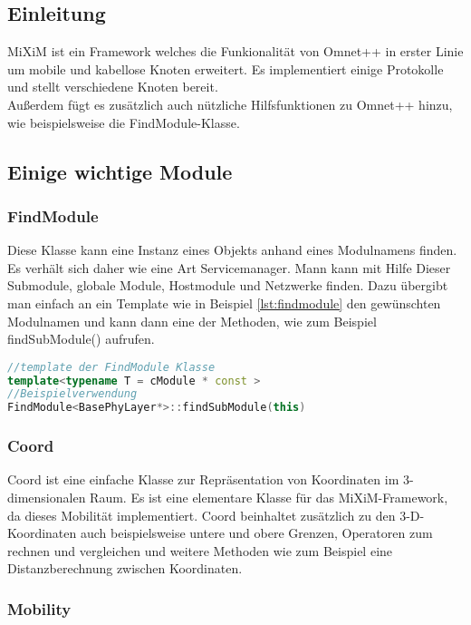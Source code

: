 \subsection{Einleitung}

MiXiM\cite{mixim} ist ein Framework welches die Funkionalität von Omnet++ in erster Linie um mobile und kabellose Knoten erweitert. Es implementiert einige Protokolle und stellt verschiedene Knoten bereit.\\
Außerdem fügt es zusätzlich auch nützliche Hilfsfunktionen zu Omnet++ hinzu, wie beispielsweise die FindModule-Klasse.

\subsection{Einige wichtige Module}

\subsubsection{FindModule}

Diese Klasse kann eine Instanz eines Objekts anhand eines Modulnamens finden. Es verhält sich daher wie eine Art Servicemanager. Mann kann mit Hilfe Dieser Submodule, globale Module, Hostmodule und Netzwerke finden. Dazu übergibt man einfach an ein Template wie in Beispiel \ref{lst:findmodule} den gewünschten Modulnamen und kann dann eine der Methoden, wie zum Beispiel findSubModule() aufrufen.

\begin{lstlisting}[language=C++, caption={Beispiel FindModule}, label=lst:findmodule]
//template der FindModule Klasse
template<typename T = cModule * const >
//Beispielverwendung
FindModule<BasePhyLayer*>::findSubModule(this)
\end{lstlisting}

\subsubsection{Coord}

Coord ist eine einfache Klasse zur Repräsentation von Koordinaten im 3-dimensionalen Raum. Es ist eine elementare Klasse für das MiXiM-Framework, da dieses Mobilität implementiert. Coord beinhaltet zusätzlich zu den 3-D-Koordinaten auch beispielsweise untere und obere Grenzen, Operatoren zum rechnen und vergleichen und weitere Methoden wie zum Beispiel eine Distanzberechnung zwischen Koordinaten.

\subsubsection{Mobility}

